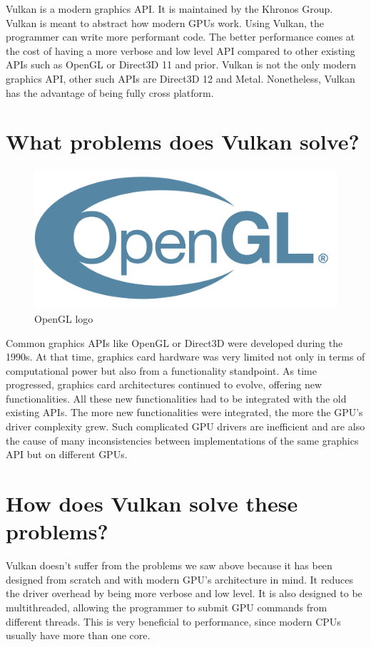 Vulkan is a modern graphics API. It is maintained by the Khronos Group.
Vulkan is meant to abstract how modern GPUs work.
Using Vulkan, the programmer can write more performant code.
The better performance comes at the cost of having a more verbose and low level API compared to
other existing APIs such as OpenGL or Direct3D 11 and prior.
Vulkan is not the only modern graphics API, other such APIs are Direct3D 12 and Metal.
Nonetheless, Vulkan has the advantage of being fully cross platform.

\section{What problems does Vulkan solve?}

\begin{figure}
    \begin{center}
        \includegraphics[scale=0.10]{images/ChVulkan/OpenGLLogo.png}
    \end{center}
    \caption{OpenGL logo}
    \label{fig:OpenGLLogo}
\end{figure}

Common graphics APIs like OpenGL or Direct3D were developed during the 1990s.
At that time, graphics card hardware was very limited not only in terms of computational
power but also from a functionality standpoint. As time progressed, graphics card architectures
continued to evolve, offering new functionalities.
All these new functionalities had to be integrated with the old existing APIs.
The more new functionalities were integrated, the more the GPU's driver complexity grew.
Such complicated GPU drivers are inefficient and are also the cause of many
inconsistencies between implementations of the same graphics API but on different GPUs.

\section{How does Vulkan solve these problems?}

Vulkan doesn't suffer from the problems we saw above because it has been designed from scratch
and with modern GPU's architecture in mind.
It reduces the driver overhead by being more verbose and low level.
It is also designed to be multithreaded, allowing the programmer to submit GPU commands from
different threads.
This is very beneficial to performance, since modern CPUs usually have more than one core.
